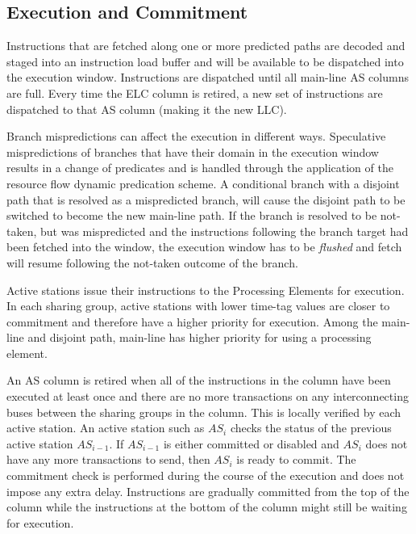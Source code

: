 \documentclass[10pt,twocolumn]{IEEEtran}
\begin{document}
\subsection {Execution and Commitment}
%
Instructions that are fetched along one or more predicted paths are
decoded and staged into an instruction load
buffer and will be available to be dispatched into the execution
window.  Instructions are dispatched until all main-line AS columns
are full.
Every time the ELC column is retired,
a new set of instructions are dispatched to that AS column (making it
the new LLC).

Branch mispredictions can affect the execution in different
ways.  Speculative mispredictions of branches that have their domain
in the execution window results in a change of predicates and is 
handled through
the application of the resource flow dynamic predication scheme.
A conditional branch with a disjoint path that is
resolved as a mispredicted branch, will cause the disjoint path to
be switched to become the new main-line path.
If the branch is resolved to be not-taken, but was mispredicted and the
instructions following the branch target had been fetched into the window,
the execution window has to be \emph{flushed} and fetch
will resume following the not-taken outcome of the branch.

Active stations issue their instructions to the 
Processing Elements for execution.
In each sharing group, active stations with lower time-tag values are closer
to commitment and therefore have a higher priority for execution.
Among the main-line and disjoint path, main-line has higher priority
for using a processing element.

An AS column is retired when all of the instructions in the column have been
executed at least once and there are no more transactions on any 
interconnecting
buses between the sharing groups in the column.  This is locally
verified by each active station.  An active station such as $AS_i$
checks the status of the previous active station $AS_{i-1}$.  If
$AS_{i-1}$ is either committed or disabled and $AS_i$ does not have any
more transactions to send, then $AS_i$ is ready to commit.  The
commitment check is performed during the course of the execution and
does not impose any extra delay.  Instructions are gradually committed
from the top of the column while the instructions at the bottom of the
column might still be waiting for execution.
%
%
\end{document}
